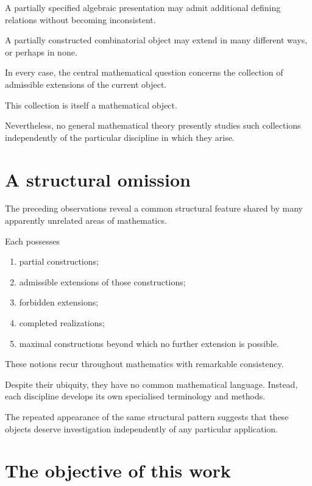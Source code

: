 \documentclass[13pt,openany]{book}
\theoremstyle{plain}
\theoremstyle{definition}
\begin{document}
A partially specified algebraic presentation may admit additional defining
relations without becoming inconsistent.

A partially constructed combinatorial object may extend in many different ways,
or perhaps in none.

In every case, the central mathematical question concerns the collection of
admissible extensions of the current object.

This collection is itself a mathematical object.

Nevertheless, no general mathematical theory presently studies such collections
independently of the particular discipline in which they arise.


\section{A structural omission}

The preceding observations reveal a common structural feature shared by many
apparently unrelated areas of mathematics.

Each possesses

\begin{enumerate}
\item partial constructions;
\item admissible extensions of those constructions;
\item forbidden extensions;
\item completed realizations;
\item maximal constructions beyond which no further extension is possible.
\end{enumerate}

These notions recur throughout mathematics with remarkable consistency.

Despite their ubiquity, they have no common mathematical language.
Instead, each discipline develops its own specialised terminology and methods.

The repeated appearance of the same structural pattern suggests that these
objects deserve investigation independently of any particular application.


\section{The objective of this work}
\end{document}
